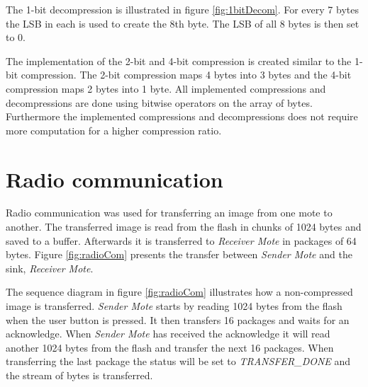 The 1-bit decompression is illustrated in figure \ref{fig:1bitDecom}. For every 7 bytes the LSB in each is used to create the 8th byte. The LSB of all 8 bytes is then set to 0.



The implementation of the 2-bit and 4-bit compression is created similar to the 1-bit compression. The 2-bit compression maps 4 bytes into 3 bytes and the 4-bit compression maps 2 bytes into 1 byte.
\FloatBarrier
All implemented compressions and decompressions are done using bitwise operators on the array of bytes. Furthermore the implemented compressions and decompressions does not require more computation for a higher compression ratio.


\section{Radio communication}
Radio communication was used for transferring an image from one mote to another. The transferred image is read from the flash in chunks of 1024 bytes and saved to a buffer. Afterwards it is transferred to \emph{Receiver Mote} in packages of 64 bytes. Figure \ref{fig:radioCom} presents the transfer between \emph{Sender Mote} and the sink, \emph{Receiver Mote}.






The sequence diagram in figure \ref{fig:radioCom} illustrates how a non-compressed image is transferred. \emph{Sender Mote} starts by reading 1024 bytes from the flash when the user button is pressed. It then transfers 16 packages and waits for an acknowledge. When \emph{Sender Mote} has received the acknowledge it will read another 1024 bytes from the flash and transfer the next 16 packages. When transferring the last package the status will be set to \emph{TRANSFER\_DONE} and the stream of bytes is transferred.

\FloatBarrier


